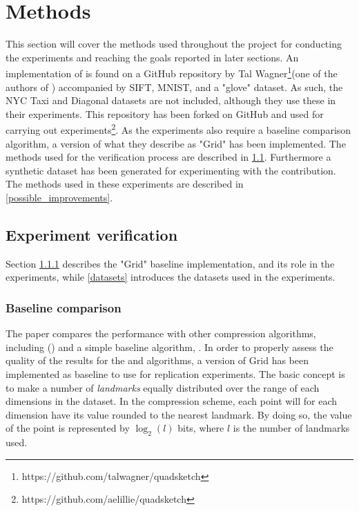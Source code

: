 \section{Methods}
\label{methods}
This section will cover the methods used throughout the project for conducting the experiments and reaching the goals reported in later sections. An implementation of \qs{} is found on a GitHub repository by Tal Wagner\footnote{https://github.com/talwagner/quadsketch}(one of the authors of \cite{wagner17}) accompanied by SIFT, MNIST, and a "glove" dataset. As such, the NYC Taxi and Diagonal datasets are not included, although they use these in their experiments. This repository has been forked on GitHub and used for carrying out experiments\footnote{https://github.com/aelillie/quadsketch}. As the experiments also require a baseline comparison algorithm, a version of what they describe as "Grid" has been implemented. The methods used for the verification process are described in \ref{experiment_verification}. Furthermore a synthetic dataset has been generated for experimenting with the \qsr{} contribution. The methods used in these experiments are described in \ref{possible_improvements}.  

\subsection{Experiment verification}
\label{experiment_verification}
Section \ref{baseline} describes the "Grid" baseline implementation, and its role in the experiments, while \ref{datasets} introduces the datasets used in the experiments.

\subsubsection{Baseline comparison}
\label{baseline}
The paper compares the \qs{} performance with other compression algorithms, including (\pq{}) and a simple baseline algorithm, \gr{}. In order to properly assess the quality of the results for the \qs{} and \qsr{} algorithms, a version of Grid has been implemented as baseline to use for replication experiments. The basic concept is to make a number of \textit{landmarks} equally distributed over the range of each dimensions in the dataset. In the compression scheme, each point will for each dimension have its value rounded to the nearest landmark. By doing so, the value of the point is represented by \ensuremath{\log_2(l)} bits, where $l$ is the number of landmarks used.

